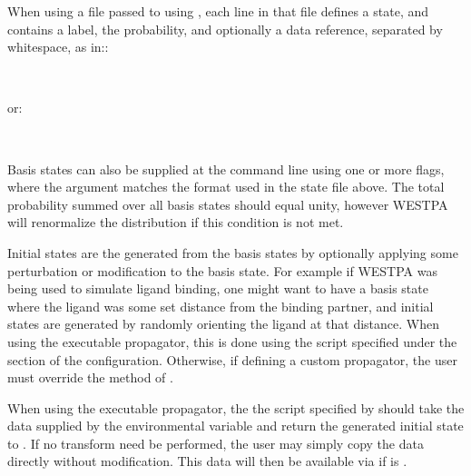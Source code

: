 \documentclass[letterpaper,10pt,english]{sphinxmanual}
\begin{document}
When using a file passed to  using , each line in
that file defines a state, and contains a label, the probability, and
optionally a data reference, separated by whitespace, as in::

\begin{sphinxVerbatim}[commandchars=\\\{\}]
    
\end{sphinxVerbatim}

or:

\begin{sphinxVerbatim}[commandchars=\\\{\}]
            
            
\end{sphinxVerbatim}

Basis states can also be supplied at the command line using one or more
 flags, where the argument matches the format used in the state
file above. The total probability summed over all basis states should equal
unity, however WESTPA will renormalize the distribution if this condition is
not met.

Initial states are the generated from the basis states by optionally applying
some perturbation or modification to the basis state. For example if WESTPA was
being used to simulate ligand binding, one might want to have a basis state
where the ligand was some set distance from the binding partner, and initial
states are generated by randomly orienting the ligand at that distance. When
using the executable propagator, this is done using the script specified under
the  section of the  configuration. Otherwise, if
defining a custom propagator, the user must override the  method
of .

When using the executable propagator, the the script specified by
 should take the data supplied by the environmental variable
 and return the generated initial state to
. If no transform need be performed, the user may
simply copy the data directly without modification. This data will then be
available via  if 
is .
\end{document}
